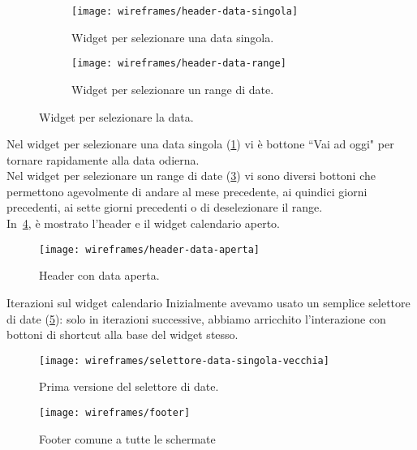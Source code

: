 \documentclass[../../../main.tex]{subfiles}
\begin{document}
\begin{figure}[H]
    \begin{subfigure}[b]{0.5\textwidth}
        \centering
        \texttt{[image: wireframes/header-data-singola]}
        \caption{Widget per selezionare una data singola.}
        \label{fig:header-data-singola}
    \end{subfigure}
\hfill
    \begin{subfigure}[b]{0.5\textwidth}
        \centering
        \texttt{[image: wireframes/header-data-range]}
        \caption{Widget per selezionare un range di date.}
        \label{fig:header-data-range}
    \end{subfigure}
    \caption{Widget per selezionare la data.}
\end{figure}


Nel widget per selezionare una data singola (\ref{fig:header-data-singola}) vi è bottone ``Vai ad oggi" per tornare rapidamente alla data odierna.\\
Nel widget per selezionare un range di date (\ref{fig:header-data-range}) vi sono diversi bottoni che permettono agevolmente di andare al mese precedente, ai quindici giorni precedenti, ai sette giorni precedenti o di deselezionare il range.\\
In~\ref{fig:header-data-aperta}, è mostrato l'header e il widget calendario aperto.

\begin{figure}[H]
    \centering
    \texttt{[image: wireframes/header-data-aperta]}
    \caption{Header con data aperta.}\label{fig:header-data-aperta}
\end{figure}

\begin{bclogo}{Iterazioni sul widget calendario}
    Inizialmente avevamo usato un semplice selettore di date (\ref{fig:selettore-data-singola-vecchia}): solo in iterazioni successive, abbiamo arricchito l'interazione con bottoni di shortcut alla base del widget stesso.
\begin{figure}[H]
    \centering
    \texttt{[image: wireframes/selettore-data-singola-vecchia]}
    \caption{Prima versione del selettore di date.}\label{fig:selettore-data-singola-vecchia}
\end{figure}
\end{bclogo}

\begin{figure}[H]
    \centering
    \texttt{[image: wireframes/footer]}
    \caption{Footer comune a tutte le schermate}
    \label{fig:footer}
\end{figure}
\end{document}
